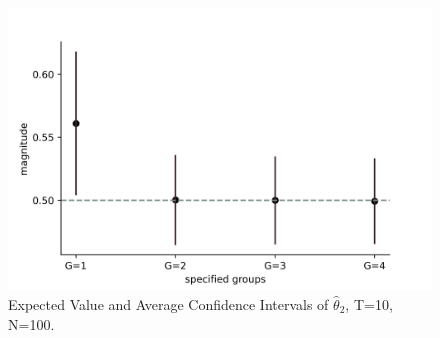 \begin{figure}[h]
\begin{center}
\includegraphics[scale=0.85]{sections/appendix/ciplottheta2.png}
\end{center}
\caption{Expected Value and Average Confidence Intervals of $\hat{\theta}_2$, T=10, N=100.}
\label{fig:ci2}
\end{figure}


%

%

%











% 


